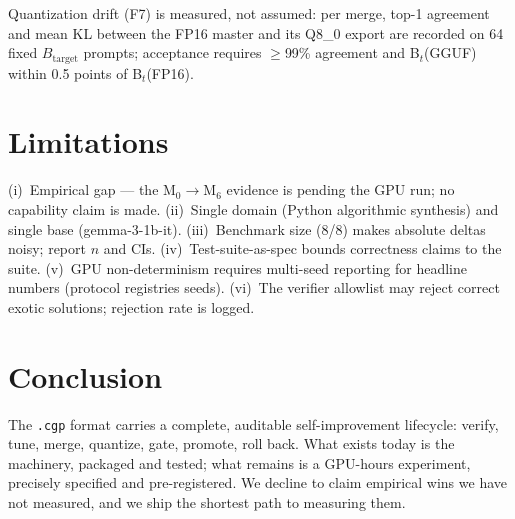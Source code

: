 \documentclass[11pt,a4paper]{article}
\begin{document}
Quantization drift (F7) is measured, not assumed: per merge, top-1 agreement
and mean KL between the FP16 master and its Q8\_0 export are recorded on 64
fixed $B_{\mathrm{target}}$ prompts; acceptance requires $\ge$99\% agreement
and B$_t$(GGUF) within 0.5 points of B$_t$(FP16).

\section{Limitations}\label{sec:limits}

(i)~Empirical gap --- the M$_0{\rightarrow}$M$_6$ evidence is pending the
GPU run; no capability claim is made. (ii)~Single domain (Python algorithmic
synthesis) and single base (gemma-3-1b-it). (iii)~Benchmark size (8/8) makes
absolute deltas noisy; report $n$ and CIs. (iv)~Test-suite-as-spec bounds
correctness claims to the suite. (v)~GPU non-determinism requires multi-seed
reporting for headline numbers (protocol registries seeds). (vi)~The verifier
allowlist may reject correct exotic solutions; rejection rate is logged.

\section{Conclusion}

The \texttt{.cgp} format carries a complete, auditable self-improvement
lifecycle: verify, tune, merge, quantize, gate, promote, roll back. What
exists today is the machinery, packaged and tested; what remains is a
GPU-hours experiment, precisely specified and pre-registered. We decline to
claim empirical wins we have not measured, and we ship the shortest path to
measuring them.



\end{document}
